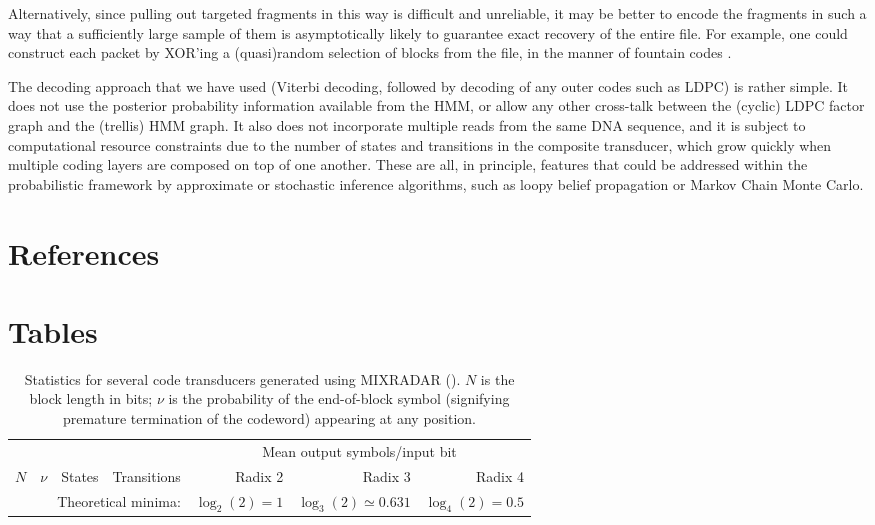 \documentclass[english]{article}
\begin{document}
Alternatively, since pulling out targeted fragments in this way is difficult and unreliable,
it may be better to encode the fragments in such a way that a sufficiently large sample of them
is asymptotically likely to guarantee exact recovery of the entire file.
For example, one could construct each packet by XOR'ing a (quasi)random selection of blocks from the file,
in the manner of fountain codes \cite{Mackay2005fountain}.

The decoding approach that we have used (Viterbi decoding, followed by decoding of any outer codes such as LDPC) is rather simple.
It does not use the posterior probability information available from the HMM, or allow any other cross-talk between the (cyclic) LDPC factor graph and the (trellis) HMM graph.
It also does not incorporate multiple reads from the same DNA sequence,
and it is subject to computational resource constraints due to the number of states and transitions in the composite transducer,
which grow quickly when multiple coding layers are composed on top of one another.
These are all, in principle, features that could be addressed within the probabilistic framework by approximate or stochastic inference algorithms,
such as loopy belief propagation or Markov Chain Monte Carlo.



\newpage
\section{References}


\newpage
\section{Tables}

\newpage
\begin{table}[h!t]
\begin{tabular}{rrrrrrr}
& & & & \multicolumn{3}{c}{Mean output symbols/input bit} \\
\cline{5-7}
$N$ & $\nu$ & States & Transitions & Radix 2 & Radix 3 & Radix 4 \\
\hline

\hline
\multicolumn{4}{r}{Theoretical minima:} & $\log_2(2) = 1$ & $\log_3(2) \simeq 0.631$ & $\log_4(2) = 0.5$
\end{tabular}
\caption{
  Statistics for several code transducers generated using MIXRADAR ().
$N$ is the block length in bits; $\nu$ is the probability of the end-of-block symbol
(signifying premature termination of the codeword) appearing at any position.
}
\end{table}
\end{document}
